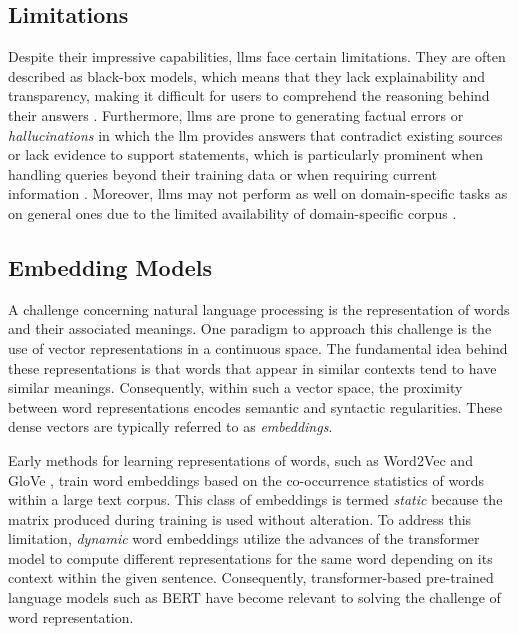 \subsection{Limitations} 
Despite their impressive capabilities, \glspl{llm} face certain limitations. They are often described as black-box models, which means that they lack explainability and transparency, making it difficult for users to comprehend the reasoning behind their answers \cite{yang_give_2024,pan_unifying_2024}. Furthermore, \glspl{llm} are prone to generating factual errors or \emph{hallucinations} in which the \gls{llm} provides answers that contradict existing sources or lack evidence to support statements, which is particularly prominent when handling queries beyond their training data or when requiring current information \cite{gao_retrieval-augmented_2024,yang_give_2024}. Moreover, \glspl{llm} may not perform as well on domain-specific tasks as on general ones due to the limited availability of domain-specific corpus \cite{yang_give_2024}.

\subsection{Embedding Models}

A challenge concerning natural language processing is the representation of words and their associated meanings. One paradigm to approach this challenge is the use of vector representations in a continuous space. The fundamental idea behind these representations is that words that appear in similar contexts tend to have similar meanings. Consequently, within such a vector space, the proximity between word representations encodes semantic and syntactic regularities. These dense vectors are typically referred to as \emph{embeddings}. \cite{banerjee_knowledge_2024, pennington_glove_2014, mikolov_efficient_2013}

Early methods for learning representations of words, such as Word2Vec \cite{mikolov_efficient_2013} and GloVe \cite{pennington_glove_2014}, train word embeddings based on the co-occurrence statistics of words within a large text corpus. This class of embeddings is termed \emph{static} because the matrix produced during training is used without alteration. To address this limitation, \emph{dynamic} word embeddings utilize the advances of the transformer model to compute different representations for the same word depending on its context within the given sentence. Consequently, transformer-based pre-trained language models such as BERT \cite{devlin_bert_2019} have become relevant to solving the challenge of word representation. \cite{banerjee_knowledge_2024}


